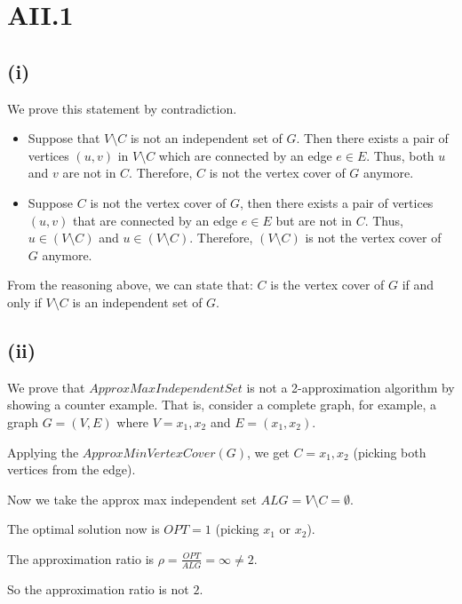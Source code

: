 \section* {AII.1}
\label {a2-1}
\subsection*{(i)}
We prove this statement by contradiction.

\begin{itemize}
	\item Suppose that $V \setminus C$ is not an independent set of $G$. Then there exists a pair of vertices $(u,v)$ in $V \setminus C$ which are connected by an edge $e \in E$. Thus, both $u$ and $v$ are not in $C$. Therefore, $C$ is not the vertex cover of $G$ anymore.
	\item Suppose $C$ is not the vertex cover of $G$, then there exists a pair of vertices $(u,v)$ that are connected by an edge $e \in E$ but are not in $C$. Thus, $u \in (V \setminus C)$ and $u \in (V \setminus C)$. Therefore, $(V \setminus C)$ is not the vertex cover of $G$ anymore.

\end{itemize}

From the reasoning above, we can state that: $C$ is the vertex cover of $G$ if and only if $V \setminus C$ is an independent set of $G$.

\subsection*{(ii)}
We prove that $ApproxMaxIndependentSet$ is not a 2-approximation algorithm by showing a counter example. That is, consider a complete graph, for example, a graph $G = (V, E)$ where $V = {x_1, x_2}$ and $E = (x_1, x_2)$. 

Applying the $ApproxMinVertexCover(G)$, we get $C = {x_1, x_2}$ (picking both vertices from the edge).

Now we take the approx max independent set $ALG = V \setminus C = \emptyset$.

The optimal solution now is $OPT = 1$ (picking $x_1$ or $x_2$).

The approximation ratio is $\rho = \frac{OPT}{ALG} = \infty \neq 2$.

So the approximation ratio is not $2$.
